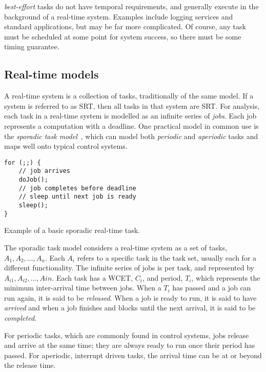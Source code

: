 \emph{best-effort} tasks do not have temporal requirements, and generally execute in the
background of a real-time system. Examples include logging services and standard applications, but
may be far more complicated. Of course, any task must be scheduled at some point for system success,
so there must be some timing guarantee. 

\subsection{Real-time models}

A real-time system is a collection of tasks, traditionally of the same model. If a system is
referred to as \gls{SRT}, then all tasks in that system are \gls{SRT}. For analysis, each task in a
real-time system is modelled as an infinite series of \emph{jobs}. Each job represents a computation
with a deadline. 
One practical model in common use is the \emph{sporadic task model}~\citep{Sprunt_SL_89a}, which can
model both \emph{periodic} and \emph{aperiodic} tasks and maps well onto typical control systems. 

\begin{listing}
    \begin{verbatim}
for (;;) {
    // job arrives
    doJob();
    // job completes before deadline
    // sleep until next job is ready
    sleep();
}
    \end{verbatim}
\caption{Example of a basic sporadic real-time task.}
\label{list:sporadic}
\end{listing}


The sporadic task model considers a real-time system as a set of tasks, $A_{1},A_{2},\ldots,A_{n}$.
Each $A_{i}$ refers to a specific task in the task set, usually each for a different functionality.
The infinite series of jobs is per task, and represented by $A_{i1},A_{i2},\ldots,A{in}$. Each task has
a \gls{WCET}, $C_{i}$, and period, $T_{i}$, which represents the minimum inter-arrival time
between jobs. When a $T_{i}$ has passed and a job can run again, it is said to be \emph{released}.
When a job is ready to run, it is said to have \emph{arrived} and when a job finishes and blocks until
the next arrival, it is said to be \emph{completed}. 

For periodic tasks, which are commonly found in control systems, jobs release and arrive at the same
time; they are always ready to run once their period has passed. For aperiodic, \ie interrupt driven
tasks, the arrival time can be at or beyond the release time. 

